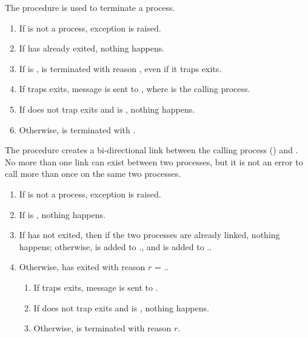 \begin{procedure}
\end{procedure}
\returns{} 

The  procedure is used to terminate a process.
\begin{enumerate}
\item If  is not a process, exception  is raised.
\item If  has already exited, nothing happens.
\item If  is ,  is terminated
  with reason , even if it traps exits.
\item If  traps exits, message  is sent to , where  is the
  calling process.
\item If  does not trap exits and  is
  , nothing happens.
\item Otherwise,  is terminated with .
\end{enumerate}

\begin{procedure}
\end{procedure}
\returns{} 

The  procedure creates a bi-directional link between the
calling process () and . No more than one link
can exist between two processes, but it is not an error to call
 more than once on the same two processes.

\begin{enumerate}
\item If  is not a process, exception  is raised.
\item If  is , nothing happens.
\item If  has not exited, then if the two processes are
  already linked, nothing happens; otherwise,  is added to
  ., and  is added to
  ..
\item Otherwise,  has exited with reason $r$ =
  ..
  \begin{enumerate}
  \item If  traps exits, message 
    is sent to .
  \item If  does not trap exits and  is ,
    nothing happens.
  \item Otherwise,  is terminated with reason $r$.
  \end{enumerate}
\end{enumerate}

